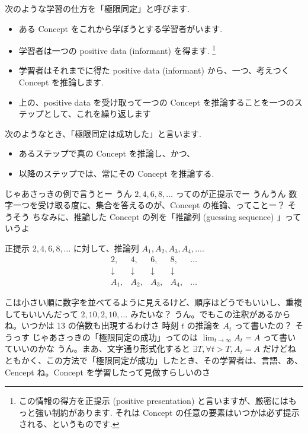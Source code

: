 \begin{boxnote}
    次のような学習の仕方を「極限同定」と呼びます.
    \begin{itemize}
        \item
            ある Concept をこれから学ぼうとする学習者がいます.
        \item
            学習者は一つの positive data (informant) を得ます. \footnote{この情報の得方を正提示 (positive presentation) と言いますが、厳密にはもっと強い制約があります. それは Concept の任意の要素はいつかは必ず提示される、というものです.}
        \item
            学習者はそれまでに得た positive data (informant) から、一つ、考えつく Concept を推論します.
        \item
            上の、positive data を受け取って一つの Concept を推論することを一つのステップとして、これを繰り返します
    \end{itemize}
    次のようなとき、「極限同定は成功した」と言います.
    \begin{itemize}
        \item
            あるステップで真の Concept を推論し、かつ、
        \item
            以降のステップでは、常にその Concept を推論する.
    \end{itemize}
\end{boxnote}

\YUKARI じゃあさっきの例で言うとー
\YUI うん
\YUKARI $2, 4, 6, 8, \ldots$ ってのが正提示でー
\YUI うんうん
\YUKARI 数字一つを受け取る度に、集合を答えるのが、Concept の推論、ってことー？
\YUZUKO そうそう
\YUZUKO ちなみに、推論した Concept の列を「推論列 (guessing sequence) 」っていうよ

\begin{boxnote}
    正提示 $2, 4, 6, 8, \ldots$ に対して、推論列 $A_1, A_2, A_3, A_4, \ldots$.
\[
    \begin{array}{ccccc}
        2, & 4, & 6, & 8, & \ldots \\
        \downarrow & \downarrow & \downarrow & \downarrow & \\
        A_1, & A_2, & A_3, & A_4, & \ldots
    \end{array}
\]
\end{boxnote}

\YUZUKO こは小さい順に数字を並べてるように見えるけど、順序はどうでもいいし、重複してもいいんだって
\YUKARI $2, 10, 2, 10, \ldots$ みたいな？
\YUZUKO うん。でもこの注釈があるからね。いつかは 13 の倍数も出現するわけさ
\YUI 時刻 $t$ の推論を $A_t$ って書いたの？
\YUZUKO そうっす
\YUI じゃあさっきの「極限同定の成功」ってのは $\lim_{t \rightarrow \infty} A_t = A$ って書いていいのかな
\YUZUKO うん。まあ、文字通り形式化すると $\exists T, \forall t > T, A_t = A$ だけどね
\YUZUKO ともかく、この方法で「極限同定が成功」したとき、その学習者は、言語、あ、 Cencept ね。Concept を学習したって見做すらしいのさ


